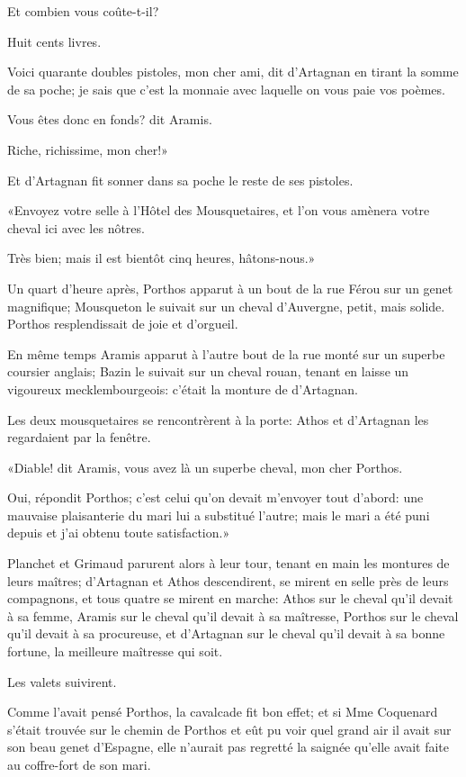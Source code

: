 \speak  Et combien vous coûte-t-il? 

\speak  Huit cents livres. 

\speak  Voici quarante doubles pistoles, mon cher ami, dit d'Artagnan en tirant la somme de sa poche; je sais que c'est la monnaie avec laquelle on vous paie vos poèmes. 

\speak  Vous êtes donc en fonds? dit Aramis. 

\speak  Riche, richissime, mon cher!» 

Et d'Artagnan fit sonner dans sa poche le reste de ses pistoles. 

«Envoyez votre selle à l'Hôtel des Mousquetaires, et l'on vous amènera votre cheval ici avec les nôtres. 

\speak  Très bien; mais il est bientôt cinq heures, hâtons-nous.» 

Un quart d'heure après, Porthos apparut à un bout de la rue Férou sur un genet magnifique; Mousqueton le suivait sur un cheval d'Auvergne, petit, mais solide. Porthos resplendissait de joie et d'orgueil. 

En même temps Aramis apparut à l'autre bout de la rue monté sur un superbe coursier anglais; Bazin le suivait sur un cheval rouan, tenant en laisse un vigoureux mecklembourgeois: c'était la monture de d'Artagnan. 

Les deux mousquetaires se rencontrèrent à la porte: Athos et d'Artagnan les regardaient par la fenêtre. 

«Diable! dit Aramis, vous avez là un superbe cheval, mon cher Porthos. 

\speak  Oui, répondit Porthos; c'est celui qu'on devait m'envoyer tout d'abord: une mauvaise plaisanterie du mari lui a substitué l'autre; mais le mari a été puni depuis et j'ai obtenu toute satisfaction.» 

Planchet et Grimaud parurent alors à leur tour, tenant en main les montures de leurs maîtres; d'Artagnan et Athos descendirent, se mirent en selle près de leurs compagnons, et tous quatre se mirent en marche: Athos sur le cheval qu'il devait à sa femme, Aramis sur le cheval qu'il devait à sa maîtresse, Porthos sur le cheval qu'il devait à sa procureuse, et d'Artagnan sur le cheval qu'il devait à sa bonne fortune, la meilleure maîtresse qui soit. 

Les valets suivirent. 

Comme l'avait pensé Porthos, la cavalcade fit bon effet; et si Mme Coquenard s'était trouvée sur le chemin de Porthos et eût pu voir quel grand air il avait sur son beau genet d'Espagne, elle n'aurait pas regretté la saignée qu'elle avait faite au coffre-fort de son mari. 


